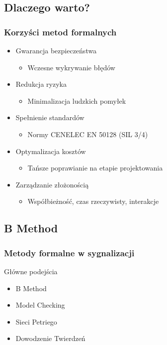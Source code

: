 \documentclass{beamer}
\begin{document}
\subsection{Dlaczego warto?}
\begin{frame}
\frametitle{Korzyści metod formalnych}
\begin{itemize}
\item Gwarancja bezpieczeństwa
\begin{itemize}
\item Wczesne wykrywanie błędów
\end{itemize}

\item Redukcja ryzyka
\begin{itemize}
\item Minimalizacja ludzkich pomyłek
\end{itemize}

\item Spełnienie standardów
\begin{itemize}
\item Normy CENELEC EN 50128 (SIL 3/4)
\end{itemize}

\item Optymalizacja kosztów
\begin{itemize}
\item Tańsze poprawianie na etapie projektowania
\end{itemize}

\item Zarządzanie złożonością
\begin{itemize}
\item Współbieżność, czas rzeczywisty, interakcje
\end{itemize}
\end{itemize}
\end{frame}

\subsection{B Method}
\begin{frame}
\frametitle{Metody formalne w sygnalizacji}
\begin{block}{Główne podejścia}
\begin{itemize}
\item B Method
\item Model Checking
\item Sieci Petriego
\item Dowodzenie Twierdzeń
\end{itemize}
\end{block}
\end{frame}
\end{document}
